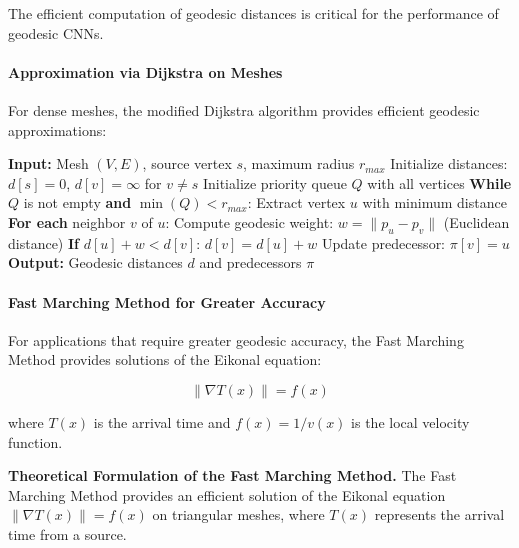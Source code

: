 The efficient computation of geodesic distances is critical for the performance of geodesic CNNs.

\paragraph{Approximation via Dijkstra on Meshes}

For dense meshes, the modified Dijkstra algorithm provides efficient geodesic approximations:

\begin{algorithm}[H]
\caption{Geodesic Dijkstra on a Triangular Mesh}
\begin{algorithmic}[1]
    \State \textbf{Input:} Mesh $(V, E)$, source vertex $s$, maximum radius $r_{max}$
    \State Initialize distances: $d[s] = 0$, $d[v] = \infty$ for $v \neq s$
    \State Initialize priority queue $Q$ with all vertices
    \State \textbf{While} $Q$ is not empty \textbf{and} $\min(Q) < r_{max}$:
    \State \quad Extract vertex $u$ with minimum distance
    \State \quad \textbf{For each} neighbor $v$ of $u$:
    \State \quad \quad Compute geodesic weight: $w = \|p_u - p_v\|$ (Euclidean distance)
    \State \quad \quad \textbf{If} $d[u] + w < d[v]$:
    \State \quad \quad \quad $d[v] = d[u] + w$
    \State \quad \quad \quad Update predecessor: $\pi[v] = u$
    \State \textbf{Output:} Geodesic distances $d$ and predecessors $\pi$
\end{algorithmic}
\end{algorithm}

\paragraph{Fast Marching Method for Greater Accuracy}

For applications that require greater geodesic accuracy, the Fast Marching Method provides solutions of the Eikonal equation:

\begin{equation}
\|\nabla T(x)\| = f(x)
\end{equation}

where $T(x)$ is the arrival time and $f(x) = 1/v(x)$ is the local velocity function.

\textbf{Theoretical Formulation of the Fast Marching Method.} The Fast Marching Method provides an efficient solution of the Eikonal equation $\|\nabla T(x)\| = f(x)$ on triangular meshes, where $T(x)$ represents the arrival time from a source.

